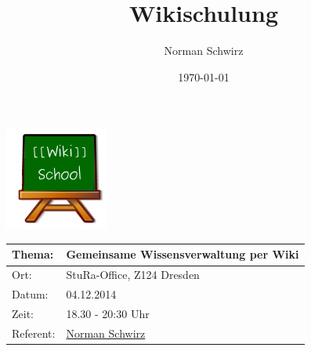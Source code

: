 \documentclass{beamer}
\title{Wikischulung}
\author{Norman Schwirz}
\date{\today}
\begin{document}
\begin{frame} %

  \begin{center}
    \includegraphics[keepaspectratio=true]{wikischool-logo}
    \begin{longtable}{|l|l|}
      \hline
       
       \textbf{Thema:}        &  \textbf{Gemeinsame Wissensverwaltung per Wiki}                 \\ 
      \hline
       
       Ort:                   &  StuRa-Office, Z124 Dresden                                      \\ 
      \hline
       
       Datum:                 &  04.12.2014                                                      \\ 
      \hline
       
       Zeit:                  &  18.30 - 20:30 Uhr                                               \\ 
      \hline
       
       Referent:              &  \href{http://www2.htw-dresden.de/~s70341/cgi-bin/dokuwiki/doku.php?id=user:norman}{Norman Schwirz}  \\ 
      \hline
       
    \end{longtable}
  \end{center}
\end{frame}


 
\end{document}

